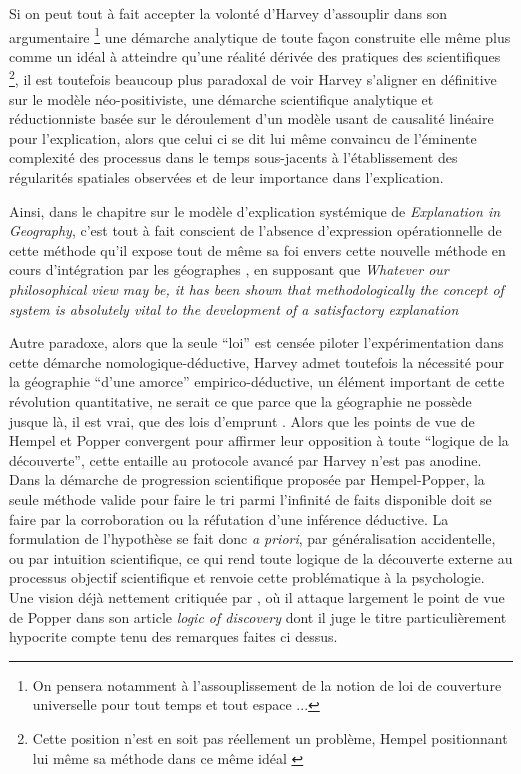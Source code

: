 Si on peut tout à fait accepter la volonté d'Harvey d'assouplir dans son argumentaire \footnote{On pensera notamment à l'assouplissement de la notion de loi de couverture universelle pour tout temps et tout espace ... } une démarche analytique de toute façon construite elle même plus comme un idéal à atteindre qu'une réalité dérivée des pratiques des scientifiques \footnote{Cette position n'est en soit pas réellement un problème, Hempel positionnant lui même sa méthode dans ce même idéal \autocite{Besse2000}}, il est toutefois beaucoup plus paradoxal de voir Harvey s'aligner en définitive sur le modèle néo-positiviste, une démarche scientifique analytique et réductionniste \autocite[57-59]{Paterson1984} basée sur le déroulement d'un modèle usant de causalité linéaire pour l'explication, alors que celui ci se dit lui même convaincu de l'éminente complexité des processus dans le temps sous-jacents à l'établissement des régularités spatiales observées et de leur importance dans l'explication.

Ainsi, dans le chapitre sur le modèle d'explication systémique de \textit{Explanation in Geography}, c'est tout à fait conscient de l'absence d'expression opérationnelle de cette méthode qu'il expose tout de même sa foi envers cette nouvelle méthode en cours d'intégration par les géographes \autocite[449,469]{Harvey1969}, en supposant que \textit{Whatever our philosophical view may be, it has been shown that methodologically the concept of system is absolutely vital to the development of a satisfactory explanation} \autocite[479]{Harvey1969}

Autre paradoxe, alors que la seule \enquote{loi} est censée piloter l’expérimentation dans cette démarche nomologique-déductive, Harvey admet toutefois la nécessité pour la géographie \enquote{d'une amorce} empirico-déductive, un élément important de cette révolution quantitative, ne serait ce que parce que la géographie ne possède jusque là, il est vrai, que des lois d'emprunt \autocite[41-42]{Harvey1969}. Alors que les points de vue de Hempel et Popper convergent pour affirmer leur opposition à toute \enquote{logique de la découverte}, cette entaille au protocole avancé par Harvey n'est pas anodine. Dans la démarche de progression scientifique proposée par Hempel-Popper, la seule méthode valide pour faire le tri parmi l'infinité de faits disponible doit se faire par la corroboration ou la réfutation d'une inférence déductive. La formulation de l'hypothèse se fait donc \textit{a priori}, par généralisation accidentelle, ou par intuition scientifique, ce qui rend toute logique de la découverte externe au processus objectif scientifique et renvoie cette problématique à la psychologie. Une vision déjà nettement critiquée par \textcite{Simon1973}, où il attaque largement le point de vue de Popper dans son article \textit{logic of discovery} dont il juge le titre particulièrement hypocrite compte tenu des remarques faites ci dessus. 

